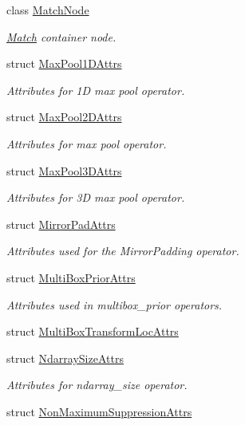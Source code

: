 \begin{DoxyCompactItemize}
class \hyperlink{classtvm_1_1relay_1_1MatchNode}{Match\+Node}
\begin{DoxyCompactList}\small\item\em \hyperlink{classtvm_1_1relay_1_1Match}{Match} container node. \end{DoxyCompactList}\item 
struct \hyperlink{structtvm_1_1relay_1_1MaxPool1DAttrs}{Max\+Pool1\+D\+Attrs}
\begin{DoxyCompactList}\small\item\em Attributes for 1D max pool operator. \end{DoxyCompactList}\item 
struct \hyperlink{structtvm_1_1relay_1_1MaxPool2DAttrs}{Max\+Pool2\+D\+Attrs}
\begin{DoxyCompactList}\small\item\em Attributes for max pool operator. \end{DoxyCompactList}\item 
struct \hyperlink{structtvm_1_1relay_1_1MaxPool3DAttrs}{Max\+Pool3\+D\+Attrs}
\begin{DoxyCompactList}\small\item\em Attributes for 3D max pool operator. \end{DoxyCompactList}\item 
struct \hyperlink{structtvm_1_1relay_1_1MirrorPadAttrs}{Mirror\+Pad\+Attrs}
\begin{DoxyCompactList}\small\item\em Attributes used for the Mirror\+Padding operator. \end{DoxyCompactList}\item 
struct \hyperlink{structtvm_1_1relay_1_1MultiBoxPriorAttrs}{Multi\+Box\+Prior\+Attrs}
\begin{DoxyCompactList}\small\item\em Attributes used in multibox\+\_\+prior operators. \end{DoxyCompactList}\item 
struct \hyperlink{structtvm_1_1relay_1_1MultiBoxTransformLocAttrs}{Multi\+Box\+Transform\+Loc\+Attrs}
\item 
struct \hyperlink{structtvm_1_1relay_1_1NdarraySizeAttrs}{Ndarray\+Size\+Attrs}
\begin{DoxyCompactList}\small\item\em Attributes for ndarray\+\_\+size operator. \end{DoxyCompactList}\item 
struct \hyperlink{structtvm_1_1relay_1_1NonMaximumSuppressionAttrs}{Non\+Maximum\+Suppression\+Attrs}

\end{DoxyCompactItemize}
